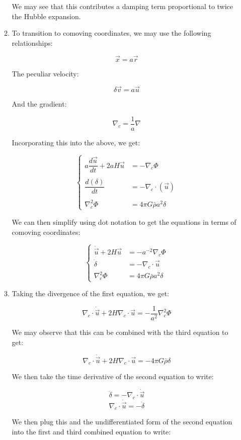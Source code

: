 \begin{enumerate}
\begin{enumerate}
        We may see that this contributes a damping term proportional to twice the Hubble expansion.

      \item To transition to comoving coordinates, we may use the following relationships:

        $$\vec{x}=a\vec{r}$$

        The peculiar velocity:

        $$\delta\vec{v}=a\vec{u}$$

        And the gradient:

        $$\nabla_c=\frac{1}{a}\nabla$$

        Incorporating this into the above, we get:

        $$\left\{\begin{array}{ll} a\dfrac{d\vec{u}}{dt}+2aH\vec{u}&=-\nabla_c\Phi\\\\ \dfrac{d(\delta)}{dt} &= -\nabla_c\cdot(\vec{u})\\\\ \nabla^2_c\Phi&=4\pi G\bar{\rho}a^2\delta \end{array}$$

        We can then simplify using dot notation to get the equations in terms of comoving coordinates:

        $$\boxed{\left\{\begin{array}{ll} \dot{\vec{u}}+2H\vec{u}&=-a^{-2}\nabla_c\Phi\\ \dot{\delta} &= -\nabla_c\cdot\vec{u}\\ \nabla^2_c\Phi&=4\pi G\bar{\rho}a^2\delta \end{array}}$$

        \item Taking the divergence of the first equation, we get:

          $$\nabla_c\cdot\dot{\vec{u}}+2H\nabla_c\cdot\vec{u}=-\frac{1}{a^2}\nabla_c^2\Phi$$

          We may observe that this can be combined with the third equation to get:

          $$\nabla_c\cdot\dot{\vec{u}}+2H\nabla_c\cdot\vec{u}=-4\pi G\bar{\rho}\delta$$

          We then take the time derivative of the second equation to write:

          $$\ddot{\delta}=-\nabla_c\cdot\dot{\vec{u}}$$
          $$\nabla_c\cdot\dot{\vec{u}}=-\ddot{\delta}$$

          We then plug this and the undifferentiated form of the second equation into the first and third combined equation to write:


\end{enumerate}
\end{enumerate}
